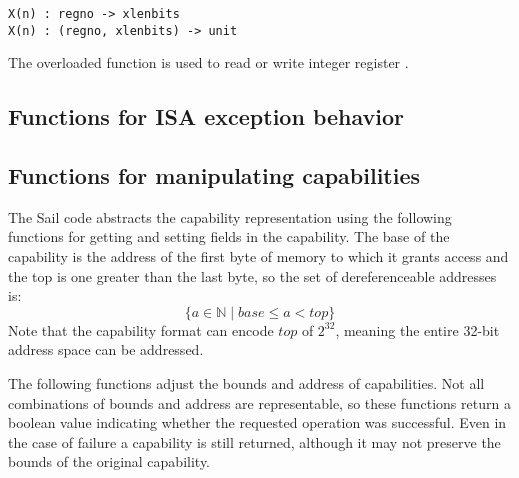 \begin{lstlisting}[language=sail,label=sailRISCVzX]
X(n) : regno -> xlenbits
X(n) : (regno, xlenbits) -> unit
\end{lstlisting}
The overloaded function  is used to read or write integer register .

\medskip

\subsection*{Functions for ISA exception behavior}

\medskip

\medskip
{}



\subsection*{Functions for manipulating capabilities}

The Sail code abstracts the capability representation using the following functions for getting and setting fields in the capability.
The base of the capability is the address of the first byte of memory to which it grants access and the top is one greater than the last byte, so the set of dereferenceable addresses is:
\[
\{ a \in \mathbb{N} \mid \mathit{base} \leq a < \mathit{top}\}
\]
Note that the capability format can encode $\mathit{top}$ of $2^{32}$, meaning the entire 32-bit address space can be addressed.

\medskip
{}

\noindent The following functions adjust the bounds and address of capabilities.
Not all combinations of bounds and address are representable, so these functions return a boolean value indicating whether the requested operation was successful.
Even in the case of failure a capability is still returned, although it may not preserve the bounds of the original capability.

